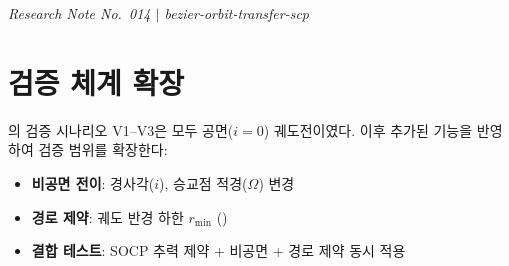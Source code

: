\documentclass[11pt]{article}
\begin{document}
\drawborder
\thispagestyle{firstpage}


{\normalsize\textit{Research Note No.~014 $|$ bezier-orbit-transfer-scp}}\par\medskip

\def\lighterdate{March 29, 2026}


\begin{abstract}
\cite{report008}에서는 공면 궤도전이 시나리오 V1--V3으로
베지어--SCP 프레임워크의 기본 동작을 검증하였다.
본 노트에서는 검증 범위를 \textbf{비공면 3차원 궤도전이}
(경사각, RAAN 변경)와 \textbf{경로 제약}(궤도 반경 하한)으로 확장한다.
4개 시나리오 V4--V7을 제시하며,
경사각 변경(V4), 이심률+경사각 동시 변경(V5),
RAAN 변경+경로 제약(V6), SOCP+비공면+경로 제약(V7)을 다룬다.
전 시나리오에서 SCP 수렴을 확인하였으며,
경계조건 위반은 $O(10^{-4})$ 수준이다.
경로 제약은 \cite{report013}의 드 카스텔조 세분화 기반으로 구현되었다.
\end{abstract}

\section{검증 체계 확장}

\cite{report008}의 검증 시나리오 V1--V3은 모두 공면($i=0$) 궤도전이였다.
이후 추가된 기능을 반영하여 검증 범위를 확장한다:
\begin{itemize}
  \item \textbf{비공면 전이}: 경사각($i$), 승교점 적경($\Omega$) 변경
  \item \textbf{경로 제약}: 궤도 반경 하한 $r_{\min}$ (\cite{report013})
  \item \textbf{결합 테스트}: SOCP 추력 제약 + 비공면 + 경로 제약 동시 적용
\end{itemize}
\end{document}
